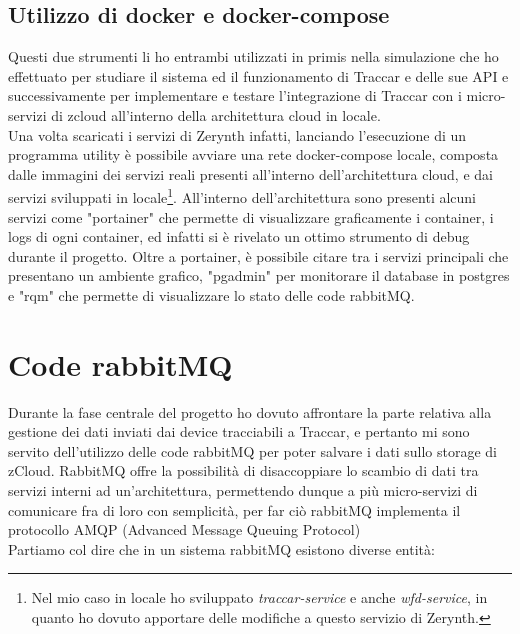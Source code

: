 \documentclass[a4paper,titlepage,12pt]{report}
\begin{document}
{\subsection{
Utilizzo di docker e docker-compose}
Questi due strumenti li ho entrambi utilizzati in primis nella simulazione che ho effettuato per studiare il sistema ed il funzionamento di Traccar e delle sue API e successivamente per implementare e testare l'integrazione di Traccar con i micro-servizi di zcloud all'interno della architettura cloud in locale. \\
Una volta scaricati i servizi di Zerynth infatti, lanciando l'esecuzione di un programma utility è possibile avviare una rete docker-compose locale, composta dalle immagini dei servizi reali presenti all'interno dell'architettura cloud, e dai servizi sviluppati in locale\footnote{Nel mio caso in locale ho sviluppato \textit{traccar-service} e anche \textit{wfd-service}, in quanto ho dovuto apportare delle modifiche a questo servizio di Zerynth.}. 
All'interno dell'architettura sono presenti alcuni servizi come "portainer" che permette di visualizzare graficamente i container, i logs di ogni container, ed infatti si è rivelato un ottimo strumento di debug durante il progetto. Oltre a portainer, è possibile citare tra i servizi principali che presentano un ambiente grafico, "pgadmin" per monitorare il database in postgres e "rqm" che permette di visualizzare lo stato delle code rabbitMQ.


\section{
Code rabbitMQ}
Durante la fase centrale del progetto ho dovuto affrontare la parte relativa alla gestione dei dati inviati dai device tracciabili a Traccar, e pertanto mi sono servito dell'utilizzo delle code rabbitMQ per poter salvare i dati sullo storage di zCloud.
RabbitMQ offre la possibilità di disaccoppiare lo scambio di dati tra servizi interni ad un'architettura, permettendo dunque a più micro-servizi di comunicare fra di loro con semplicità, per far ciò rabbitMQ implementa il protocollo AMQP (Advanced Message Queuing Protocol)\\
Partiamo col dire che in un sistema rabbitMQ esistono diverse entità:

}
\end{document}
